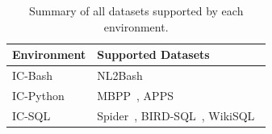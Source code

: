 \begin{table}[ht]
\centering
\begin{tabular}{l|l}
\toprule
    \benchmark{} Environment & Supported Datasets \\
\midrule
    IC-Bash & NL2Bash~\cite{lin-etal-2018-nl2bash} \\
    IC-Python & MBPP~\cite{austin2021program}, APPS~\cite{hendrycksapps2021} \\
    IC-SQL & Spider~\cite{yu-etal-2018-spider}, BIRD-SQL~\cite{li2023llm}, WikiSQL~\cite{zhong2017seq2sql} \\
\bottomrule
\end{tabular}
\vspace{0.5em}
\caption{Summary of all datasets supported by each \benchmark{} environment.}
\vspace{-1.5em}
\label{table:supported-datasets}
\end{table}
